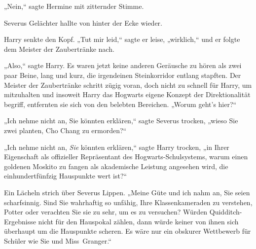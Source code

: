 „Nein,“ sagte Hermine mit zitternder Stimme.

Severus Gelächter hallte von hinter der Ecke wieder.

Harry senkte den Kopf. „Tut mir leid,“ sagte er leise, „wirklich,“ und er folgte dem Meister der Zaubertränke nach.

\later

„Also,“ sagte Harry. Es waren jetzt keine anderen Geräusche zu hören als zwei paar Beine, lang und kurz, die irgendeinen Steinkorridor entlang stapften. Der Meister der Zaubertränke schritt zügig voran, doch nicht zu schnell für Harry, um mitzuhalten und insoweit Harry das Hogwarts eigene Konzept der Direktionalität begriff, entfernten sie sich von den belebten Bereichen. „Worum geht's hier?“

„Ich nehme nicht an, Sie könnten erklären,“ sagte Severus trocken, „wieso Sie zwei planten, Cho Chang zu ermorden?“

„Ich nehme nicht an, \emph{Sie} könnten erklären,“ sagte Harry trocken, „in Ihrer Eigenschaft als offizieller Repräsentant des Hogwarts-Schulsystems, warum einen goldenen Moskito zu fangen als akademische Leistung angesehen wird, die einhundertfünfzig Hauspunkte wert ist?“

Ein Lächeln strich über Severus Lippen. „Meine Güte und ich nahm an, Sie seien scharfsinnig. Sind Sie wahrhaftig so unfähig, Ihre Klassenkameraden zu verstehen, Potter oder verachten Sie sie zu sehr, um es zu versuchen? Würden Quidditch-Ergebnisse nicht für den Hauspokal zählen, dann würde keiner von ihnen sich überhaupt um die Hauspunkte scheren. Es wäre nur ein obskurer Wettbewerb für Schüler wie Sie und Miss~Granger.“

